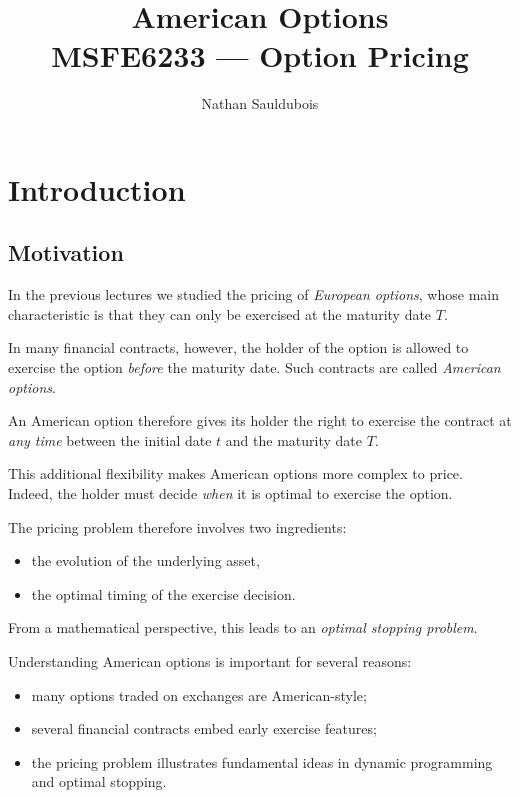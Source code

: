 \documentclass[11pt]{article}
\title{\textbf{American Options}\\
\large MSFE6233 --- Option Pricing}
\author{Nathan Sauldubois}
\date{}
\theoremstyle{definition}
\theoremstyle{plain}
\begin{document}
\maketitle

\vspace{-1em}

\section{Introduction}

\subsection{Motivation}

In the previous lectures we studied the pricing of \emph{European options},
whose main characteristic is that they can only be exercised at the
maturity date \(T\).

In many financial contracts, however, the holder of the option is allowed
to exercise the option \emph{before} the maturity date.
Such contracts are called \emph{American options}.

An American option therefore gives its holder the right to exercise the
contract at \emph{any time} between the initial date \(t\) and the maturity
date \(T\).

This additional flexibility makes American options more complex to price.
Indeed, the holder must decide \emph{when} it is optimal to exercise the
option.

The pricing problem therefore involves two ingredients:
\begin{itemize}[leftmargin=1.4em]
\item the evolution of the underlying asset,
\item the optimal timing of the exercise decision.
\end{itemize}

From a mathematical perspective, this leads to an \emph{optimal stopping problem}.

Understanding American options is important for several reasons:

\begin{itemize}[leftmargin=1.4em]
\item many options traded on exchanges are American-style;
\item several financial contracts embed early exercise features;
\item the pricing problem illustrates fundamental ideas in dynamic
programming and optimal stopping.
\end{itemize}
\end{document}
